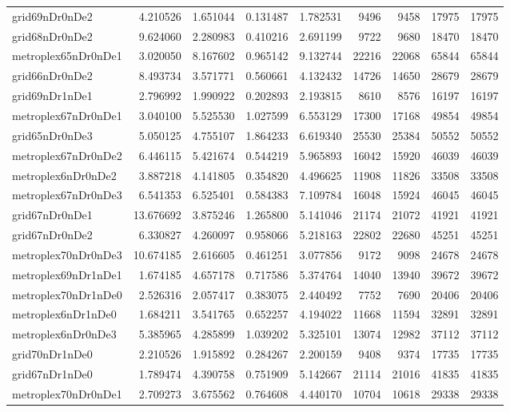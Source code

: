 \begin{longtable}{|l|r|r|r|r|r|r|r|r|}
grid69nDr0nDe2 & 4.210526 & 1.651044 & 0.131487 & 1.782531 & 9496 & 9458 & 17975 & 17975 \\
grid68nDr0nDe2 & 9.624060 & 2.280983 & 0.410216 & 2.691199 & 9722 & 9680 & 18470 & 18470 \\
metroplex65nDr0nDe1 & 3.020050 & 8.167602 & 0.965142 & 9.132744 & 22216 & 22068 & 65844 & 65844 \\
grid66nDr0nDe2 & 8.493734 & 3.571771 & 0.560661 & 4.132432 & 14726 & 14650 & 28679 & 28679 \\
grid69nDr1nDe1 & 2.796992 & 1.990922 & 0.202893 & 2.193815 & 8610 & 8576 & 16197 & 16197 \\
metroplex67nDr0nDe1 & 3.040100 & 5.525530 & 1.027599 & 6.553129 & 17300 & 17168 & 49854 & 49854 \\
grid65nDr0nDe3 & 5.050125 & 4.755107 & 1.864233 & 6.619340 & 25530 & 25384 & 50552 & 50552 \\
metroplex67nDr0nDe2 & 6.446115 & 5.421674 & 0.544219 & 5.965893 & 16042 & 15920 & 46039 & 46039 \\
metroplex6nDr0nDe2 & 3.887218 & 4.141805 & 0.354820 & 4.496625 & 11908 & 11826 & 33508 & 33508 \\
metroplex67nDr0nDe3 & 6.541353 & 6.525401 & 0.584383 & 7.109784 & 16048 & 15924 & 46045 & 46045 \\
grid67nDr0nDe1 & 13.676692 & 3.875246 & 1.265800 & 5.141046 & 21174 & 21072 & 41921 & 41921 \\
grid67nDr0nDe2 & 6.330827 & 4.260097 & 0.958066 & 5.218163 & 22802 & 22680 & 45251 & 45251 \\
metroplex70nDr0nDe3 & 10.674185 & 2.616605 & 0.461251 & 3.077856 & 9172 & 9098 & 24678 & 24678 \\
metroplex69nDr1nDe1 & 1.674185 & 4.657178 & 0.717586 & 5.374764 & 14040 & 13940 & 39672 & 39672 \\
metroplex70nDr1nDe0 & 2.526316 & 2.057417 & 0.383075 & 2.440492 & 7752 & 7690 & 20406 & 20406 \\
metroplex6nDr1nDe0 & 1.684211 & 3.541765 & 0.652257 & 4.194022 & 11668 & 11594 & 32891 & 32891 \\
metroplex6nDr0nDe3 & 5.385965 & 4.285899 & 1.039202 & 5.325101 & 13074 & 12982 & 37112 & 37112 \\
grid70nDr1nDe0 & 2.210526 & 1.915892 & 0.284267 & 2.200159 & 9408 & 9374 & 17735 & 17735 \\
grid67nDr1nDe0 & 1.789474 & 4.390758 & 0.751909 & 5.142667 & 21114 & 21016 & 41835 & 41835 \\
metroplex70nDr0nDe1 & 2.709273 & 3.675562 & 0.764608 & 4.440170 & 10704 & 10618 & 29338 & 29338 \\

\end{longtable}
